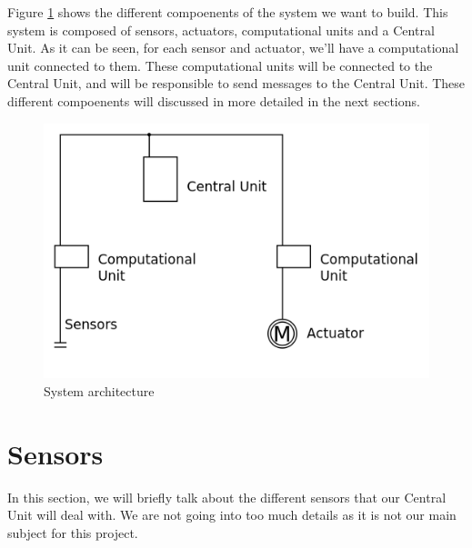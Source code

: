 \documentclass{acm_proc_article-sp}
\begin{document}
Figure \ref{architecture} shows the different compoenents of the system we want to build. This system is composed of sensors, actuators, computational units and a Central Unit. 
As it can be seen, for each sensor and actuator, we'll have a computational unit connected to them. These computational units will be connected to the Central Unit, and will be responsible to send messages to the Central Unit. 
These different compoenents will discussed in more detailed in the next sections.
				\begin{figure}[htb]
  				\begin{center}
    				\includegraphics[width=\linewidth]{architecture}
    				\caption{System architecture \label{architecture}}
  				\end{center}
				\end{figure}

\section{Sensors}\label{sensors_section}
In this section, we will briefly talk about the different sensors that our Central Unit will deal with. 
We are not going into too much details as it is not our main subject for this project.
\end{document}
